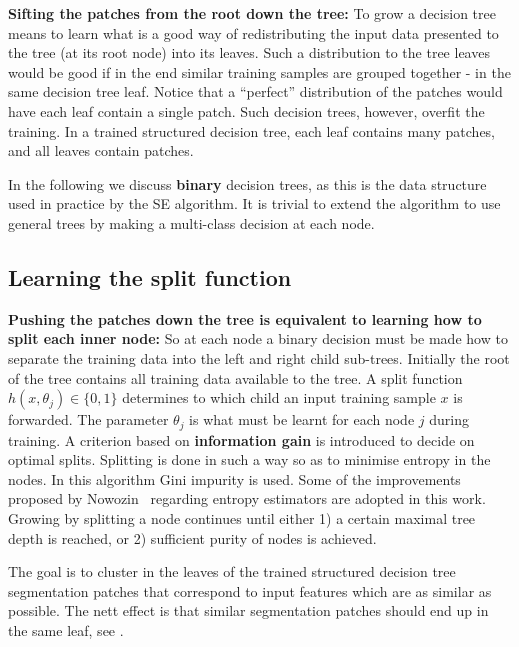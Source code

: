\textbf{Sifting the patches from the root down the tree:} To grow a decision tree means to learn what is a good way of redistributing the input data presented to the tree (at its root node) into its leaves. Such a distribution to the tree leaves would be good if in the end similar training samples are grouped together - in the same decision tree leaf. Notice that a ``perfect'' distribution of the patches would have each leaf contain a single patch. Such decision trees, however, overfit the training. In a trained structured decision tree, each leaf contains many patches, and all leaves contain patches.

In the following we discuss {\bf binary} decision trees, as this is the data structure used in practice by the SE algorithm. It is trivial to extend the algorithm to use general trees by making a multi-class decision at each node. 

\subsection{Learning the split function}
\textbf{Pushing the patches down the tree is equivalent to learning how to split each inner node:} So at each node a binary decision must be made how to separate the training data into the left and right child sub-trees. Initially the root of the tree contains all training data available to the tree. A split function $h(x,\theta_j)\in\{0,1\}$ determines to which child an input training sample $x$ is forwarded. The parameter $\theta_j$ is what must be learnt for each node $j$ during training. A criterion based on {\bf information gain} is introduced to decide on optimal %
splits. Splitting is done in such a way so as to minimise entropy in the nodes. In this algorithm Gini impurity is used. Some of the improvements proposed by Nowozin~\cite{Nowozin12improvedinformation,nowozin2014decision} regarding entropy estimators are adopted in this work. Growing by splitting a node continues until either 1) a certain maximal tree depth is reached, or 2) sufficient purity of nodes is achieved.

The goal is to cluster in the leaves of the trained structured decision tree segmentation patches that correspond to input features which are as similar as possible. The nett effect is that similar segmentation patches should end up in the same leaf, see .

